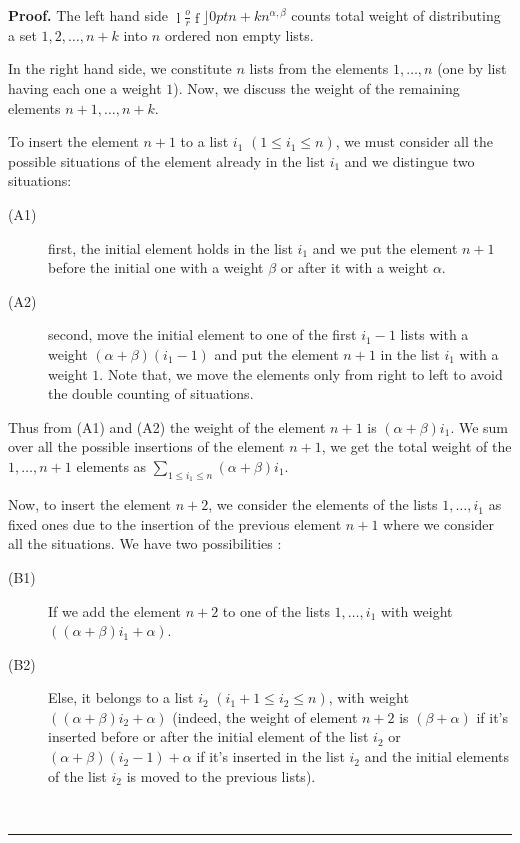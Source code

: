 \documentclass{article}
\newcommand {\lah}[2]{\genfrac\lfloor \rfloor{0pt}{}{#1}{#2}}
\newenvironment{proof}[1][Proof]{\noindent\textbf{#1.} }{\ \rule{0.5em}{0.5em}}
\begin{document}
\begin{proof}
The left hand side $\lah{n+k}{n}^{\alpha ,\beta }$ counts
total weight of distributing a set $1,2,\ldots,n+k$ into $n$ ordered non empty lists.

In the right hand side, we constitute $n$ lists from the elements $1,\ldots
,n$ (one by list having each one a weight $1$). Now, we discuss the weight
of the remaining elements $n+1,\ldots ,n+k$.

To insert the element $n+1$ to a list $i_{1}$ $(1\leq i_{1}\leq n)$, we must
consider all the possible situations of the element already in the list $%
i_{1}$ and we distingue two situations:
\begin{description}
  \item[(A1)] first, the initial element holds in the list $i_{1}$ and we put the
element $n+1$ before the initial one with a weight $\beta $ or after it with
a weight $\alpha $.
  \item[(A2)] second, move the initial element to one of the first $i_{1}-1$ lists with
a weight $\left( \alpha +\beta \right) (i_{1}-1)$ and put the element $n+1$
in the list $i_{1}$ with a weight $1$. Note that, we move the elements only
from right to left to avoid the double counting of situations.
\end{description}

Thus from (A1) and (A2) the weight of the element $n+1$ is $\left( \alpha +\beta \right)
i_{1}$. We sum over all the possible insertions of the element $n+1$, we get
the total weight of the $1,\ldots ,n+1$ elements as $\sum_{1\leq i_{1}\leq
n}\left( \alpha +\beta \right) i_{1}$.

Now, to insert the element $n+2$, we consider the elements of the lists $1,\ldots
,i_{1}$ as fixed ones due to the insertion of the previous element $n+1$
where we consider all the situations. We have two possibilities :
\begin{description}
  \item[(B1)] If we add the element $n+2$ to one of the lists $1,\ldots ,i_{1}$ with
weight $\left( \left( \alpha +\beta \right) i_{1}+\alpha \right) $.

  \item[(B2)] Else, it belongs to a list $i_{2}$ $\left( i_{1}+1\leq i_{2}\leq
n\right) $, with weight $\left( \left( \alpha +\beta \right) i_{2}+\alpha
\right) $ (indeed, the weight of element $n+2$ is $\left( \beta +\alpha \right) $ if it's inserted before or after the initial element of the list $i_{2}$ or $\left(\alpha +\beta \right) (i_{2}-1)+\alpha $ if it's inserted in the list $i_{2}$ and the initial
elements of the list $i_{2}$ is moved to the previous lists).
\end{description}


\end{proof}
\end{document}
